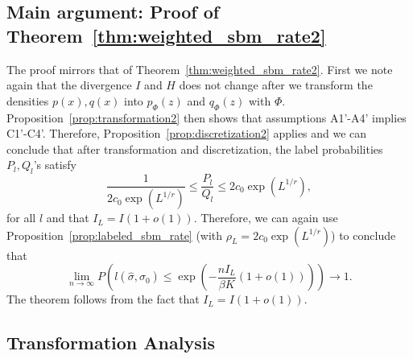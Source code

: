 \documentclass{article}
\begin{document}
\subsection{Main argument: Proof of Theorem~\ref{thm:weighted_sbm_rate2}}
\label{AppThmRate2}

The proof mirrors that of Theorem~\ref{thm:weighted_sbm_rate2}. First we note again that the divergence $I$ and $H$ does not change after we transform the densities $p(x), q(x)$ into $p_{\Phi}(z)$ and $q_{\Phi}(z)$ with $\Phi$. Proposition~\ref{prop:transformation2} then shows that assumptions A1'-A4' implies C1'-C4'. Therefore, Proposition~\ref{prop:discretization2} applies and we can conclude that after transformation and discretization, the label probabilities $P_l, Q_l$'s satisfy 
\[
\frac{1}{2c_0 \exp(L^{1/r})} \leq \frac{P_l}{Q_l} \leq 2c_0 \exp(L^{1/r}),
\]
for all $l$ and that $I_L = I(1+o(1))$. Therefore, we can again use Proposition~\ref{prop:labeled_sbm_rate} (with $\rho_L = 2 c_0 \exp(L^{1/r})$) to conclude that
\[
\lim_{n \rightarrow \infty} P \left( l(\hat{\sigma}, \sigma_0) \leq \exp \left( - \frac{ n I_L}{ \beta K} (1 + o(1)) \right) \right) \rightarrow 1.
\]
The theorem follows from the fact that $I_L = I(1+o(1))$. 

\subsection{Transformation Analysis}
\end{document}
